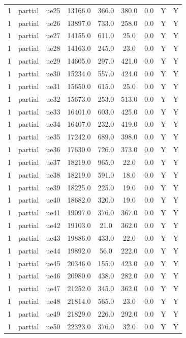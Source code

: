 \begin{table}[ht]
\begin{tabular}{|c|c|c|c|c|c|c|c|c|}
1 & partial & ue25 & 13166.0 & 366.0 & 380.0 & 0.0 & Y & Y \\
1 & partial & ue26 & 13897.0 & 733.0 & 258.0 & 0.0 & Y & Y \\
1 & partial & ue27 & 14155.0 & 611.0 & 25.0 & 0.0 & Y & Y \\
1 & partial & ue28 & 14163.0 & 245.0 & 23.0 & 0.0 & Y & Y \\
1 & partial & ue29 & 14605.0 & 297.0 & 421.0 & 0.0 & Y & Y \\
1 & partial & ue30 & 15234.0 & 557.0 & 424.0 & 0.0 & Y & Y \\
1 & partial & ue31 & 15650.0 & 615.0 & 25.0 & 0.0 & Y & Y \\
1 & partial & ue32 & 15673.0 & 253.0 & 513.0 & 0.0 & Y & Y \\
1 & partial & ue33 & 16401.0 & 603.0 & 425.0 & 0.0 & Y & Y \\
1 & partial & ue34 & 16407.0 & 232.0 & 419.0 & 0.0 & Y & Y \\
1 & partial & ue35 & 17242.0 & 689.0 & 398.0 & 0.0 & Y & Y \\
1 & partial & ue36 & 17630.0 & 726.0 & 373.0 & 0.0 & Y & Y \\
1 & partial & ue37 & 18219.0 & 965.0 & 22.0 & 0.0 & Y & Y \\
1 & partial & ue38 & 18219.0 & 591.0 & 18.0 & 0.0 & Y & Y \\
1 & partial & ue39 & 18225.0 & 225.0 & 19.0 & 0.0 & Y & Y \\
1 & partial & ue40 & 18682.0 & 320.0 & 19.0 & 0.0 & Y & Y \\
1 & partial & ue41 & 19097.0 & 376.0 & 367.0 & 0.0 & Y & Y \\
1 & partial & ue42 & 19103.0 & 21.0 & 362.0 & 0.0 & Y & Y \\
1 & partial & ue43 & 19886.0 & 433.0 & 22.0 & 0.0 & Y & Y \\
1 & partial & ue44 & 19892.0 & 56.0 & 222.0 & 0.0 & Y & Y \\
1 & partial & ue45 & 20346.0 & 155.0 & 423.0 & 0.0 & Y & Y \\
1 & partial & ue46 & 20980.0 & 438.0 & 282.0 & 0.0 & Y & Y \\
1 & partial & ue47 & 21252.0 & 345.0 & 362.0 & 0.0 & Y & Y \\
1 & partial & ue48 & 21814.0 & 565.0 & 23.0 & 0.0 & Y & Y \\
1 & partial & ue49 & 21829.0 & 226.0 & 292.0 & 0.0 & Y & Y \\
1 & partial & ue50 & 22323.0 & 376.0 & 32.0 & 0.0 & Y & Y \\

\end{tabular}
\end{table}
